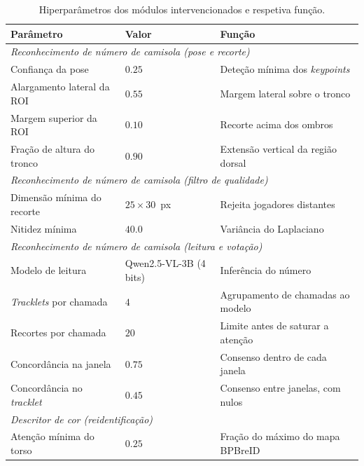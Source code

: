 \begin{table}[htbp]
    \centering
    \caption{Hiperparâmetros dos módulos intervencionados e respetiva função.}
    \label{tab:hiperparametros}
    \begin{tabular}{|l|l|l|}
        \hline
        \textbf{Parâmetro} & \textbf{Valor} & \textbf{Função} \\
        \hline
        \multicolumn{3}{|l|}{\emph{Reconhecimento de número de camisola (pose e recorte)}} \\
        \hline
        Confiança da pose            & $0.25$          & Deteção mínima dos \emph{keypoints} \\
        \hline
        Alargamento lateral da ROI   & $0.55$          & Margem lateral sobre o tronco \\
        \hline
        Margem superior da ROI       & $0.10$          & Recorte acima dos ombros \\
        \hline
        Fração de altura do tronco   & $0.90$          & Extensão vertical da região dorsal \\
        \hline
        \multicolumn{3}{|l|}{\emph{Reconhecimento de número de camisola (filtro de qualidade)}} \\
        \hline
        Dimensão mínima do recorte   & $25\times30$~px & Rejeita jogadores distantes \\
        \hline
        Nitidez mínima               & $40.0$          & Variância do Laplaciano \\
        \hline
        \multicolumn{3}{|l|}{\emph{Reconhecimento de número de camisola (leitura e votação)}} \\
        \hline
        Modelo de leitura            & Qwen2.5-VL-3B (4 bits) & Inferência do número \\
        \hline
        \emph{Tracklets} por chamada & $4$             & Agrupamento de chamadas ao modelo \\
        \hline
        Recortes por chamada         & $20$            & Limite antes de saturar a atenção \\
        \hline
        Concordância na janela       & $0.75$          & Consenso dentro de cada janela \\
        \hline
        Concordância no \emph{tracklet} & $0.45$       & Consenso entre janelas, com nulos \\
        \hline
        \multicolumn{3}{|l|}{\emph{Descritor de cor (reidentificação)}} \\
        \hline
        Atenção mínima do torso      & $0.25$          & Fração do máximo do mapa BPBreID \\

\end{tabular}
\end{table}
